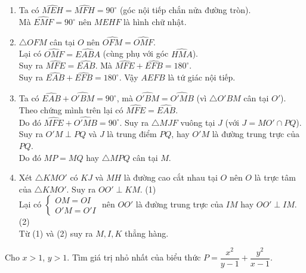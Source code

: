 \begin{ex}
{\begin{center}
\end{center}
\begin{enumerate}
\item Ta có $\widehat{MEH}=\widehat{MFH}=90^\circ$ (góc nội tiếp chắn nửa đường tròn).\\
Mà $\widehat{EMF}=90^\circ$ nên $MEHF$ là hình chữ nhật.
\item $\triangle OFM$ cân tại $O$ nên $\widehat{OFM}=\widehat{OMF}$.\\
Lại có $\widehat{OMF}=\widehat{EABA}$ (cùng phụ với góc $\widehat{HMA}$).\\
Suy ra $\widehat{MFE}=\widehat{EAB}$. Mà $\widehat{MFE}+\widehat{EFB}=180^\circ$.\\
Suy ra $\widehat{EAB}+\widehat{EFB}=180^\circ$. Vậy $AEFB$ là tứ giác nội tiếp.
\item Ta có $\widehat{EAB}+\widehat{O'BM}=90^\circ$, mà $\widehat{O'BM}=\widehat{O'MB}$ (vì $\triangle O'BM$ cân tại $O'$).\\
Theo chứng mình trên lại có $\widehat{MFE}=\widehat{EAB}$.\\
Do đó $\widehat{MFE}+\widehat{O'MB}=90^\circ$. Suy ra $\triangle MJF$ vuông tại $J$ (với $J=MO'\cap PQ$).\\
Suy ra $O'M\perp PQ$ và $J$ là trung điểm $PQ$, hay $O'M$ là đường trung trực của $PQ$.\\
Do đó $MP=MQ$ hay $\triangle MPQ$ cân tại $M$.
\item Xét $\triangle KMO'$ có $KJ$ và $MH$ là đường cao cắt nhau tại $O$ nên $O$ là trực tâm của $\triangle KMO'$. Suy ra $OO'\perp KM$. \hfill (1)\\
Lại có $\begin{cases}
OM=OI\\ O'M=O'I
\end{cases}$ nên $OO'$ là đường trung trực của $IM$ hay $OO'\perp IM$.\hfill (2)\\
Từ (1) và (2) suy ra $M,I,K$ thẳng hàng.
\end{enumerate}
}
\end{ex}

\begin{ex}%
Cho $x>1$, $y>1$. Tìm giá trị nhỏ nhất của biểu thức
$P=\dfrac{x^2}{y-1}+\dfrac{y^2}{x-1}.$
\end{ex}
